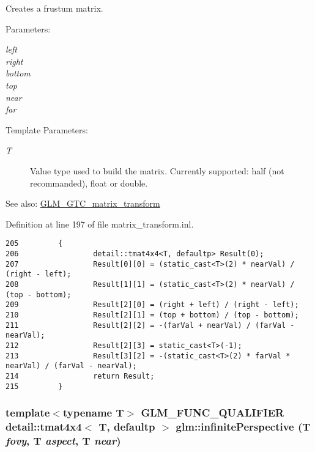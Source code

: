 Creates a frustum matrix.

\begin{Desc}
\item[Parameters:]
\begin{description}
\item[{\em left}]\item[{\em right}]\item[{\em bottom}]\item[{\em top}]\item[{\em near}]\item[{\em far}]\end{description}
\end{Desc}
\begin{Desc}
\item[Template Parameters:]
\begin{description}
\item[{\em T}]Value type used to build the matrix. Currently supported: half (not recommanded), float or double. \end{description}
\end{Desc}
\begin{Desc}
\item[See also:]\hyperlink{group__gtc__matrix__transform}{GLM\_\-GTC\_\-matrix\_\-transform} \end{Desc}


Definition at line 197 of file matrix\_\-transform.inl.

\begin{Code}\begin{verbatim}205         {
206                 detail::tmat4x4<T, defaultp> Result(0);
207                 Result[0][0] = (static_cast<T>(2) * nearVal) / (right - left);
208                 Result[1][1] = (static_cast<T>(2) * nearVal) / (top - bottom);
209                 Result[2][0] = (right + left) / (right - left);
210                 Result[2][1] = (top + bottom) / (top - bottom);
211                 Result[2][2] = -(farVal + nearVal) / (farVal - nearVal);
212                 Result[2][3] = static_cast<T>(-1);
213                 Result[3][2] = -(static_cast<T>(2) * farVal * nearVal) / (farVal - nearVal);
214                 return Result;
215         }
\end{verbatim}
\end{Code}


\hypertarget{group__gtc__matrix__transform_g2b5303a99580dc5a2ffe4cd9303397a9}{
\subsubsection[infinitePerspective]{\setlength{\rightskip}{0pt plus 5cm}template$<$typename T$>$ GLM\_\-FUNC\_\-QUALIFIER detail::tmat4x4$<$ T, defaultp $>$ glm::infinitePerspective (T {\em fovy}, \/  T {\em aspect}, \/  T {\em near})}}
\label{group__gtc__matrix__transform_g2b5303a99580dc5a2ffe4cd9303397a9}


